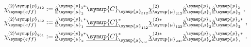 \begin{subequations} \label{eq:2-211}
	\abovedisplayskip=13pt
	\belowdisplayskip=13pt
	\begin{align}
		\chi^{(2)\symup{p}_{312}}_{\symup{eff}} &:= \hat{\underline{g}}^{\symup{p}_{3}*}_{{{\symup{\mu}}_{3}}} \symup{C}_{{\symup{\mu}}_{312}} \underline{\chi}^{(2)}_{{\symup{\mu}}_{312}} \hat{\underline{g}}^{\symup{p}_{1}}_{{\symup{\mu}}_1} \hat{\underline{g}}^{\symup{p}_{2}}_{{\symup{\mu}}_2} \label{eq:2-211a}~, \\ {\chi}^{(2)\symup{p}_{132}}_{\symup{eff}} &:= \hat{\underline{g}}^{\symup{p}_{1}*}_{{\symup{\mu}}_{1}} \underline{\symup{C}}^{*}_{{\symup{\mu}}_{132}} \underline{\chi}^{(2)*}_{{\symup{\mu}}_{132}} \hat{\underline{g}}^{\symup{p}_{3}}_{{\symup{\mu}}_3} \hat{\underline{g}}^{\symup{p}_{2}*}_{{\symup{\mu}}_2} \label{eq:2-211b}~, \\ {\chi}^{(2)\symup{p}_{231}}_{\symup{eff}} &:= \hat{\underline{g}}^{\symup{p}_{2}*}_{{\symup{\mu}}_{2}} \underline{\symup{C}}^{*}_{{\symup{\mu}}_{231}} \underline{\chi}^{(2)*}_{{\symup{\mu}}_{231}} \hat{\underline{g}}^{\symup{p}_{3}}_{{\symup{\mu}}_3} \hat{\underline{g}}^{\symup{p}_{1}*}_{{\symup{\mu}}_1} \label{eq:2-211c}~.
	\end{align}
\end{subequations}

